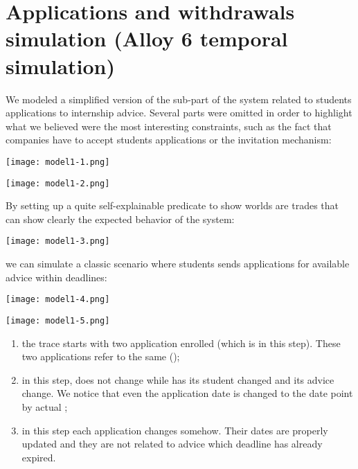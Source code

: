 	\section{Applications and withdrawals simulation (Alloy 6 temporal simulation)}
		We modeled a simplified version of the sub-part of the system related to students applications to internship advice. Several parts were omitted in order to highlight what we believed were the most interesting constraints, such as the fact that companies have to accept students applications or the invitation mechanism:
		\begin{center}
			\texttt{[image: model1-1.png]}
		\end{center}
		\begin{center}
			\texttt{[image: model1-2.png]}
		\end{center}
		By setting up a quite self-explainable predicate to show worlds are trades that can show clearly the expected behavior of the system:
		\begin{center}
			\texttt{[image: model1-3.png]}
		\end{center}
		we can simulate a classic scenario where students sends applications for available advice within deadlines:
		\begin{center}
			\texttt{[image: model1-4.png]}
		\end{center}
		\begin{center}
			\texttt{[image: model1-5.png]}
		\end{center}
		\begin{enumerate}[start=0]
			\item the trace starts with two application enrolled  (which is  in this step). These two applications refer to the same  ();
			\item in this step,  does not change while  has its student changed and its advice change. We notice that even the application date is changed to the date point by actual ;
			\item in this step each application changes somehow. Their dates are properly updated and they are not related to advice which deadline has already expired.
		\end{enumerate}
		
